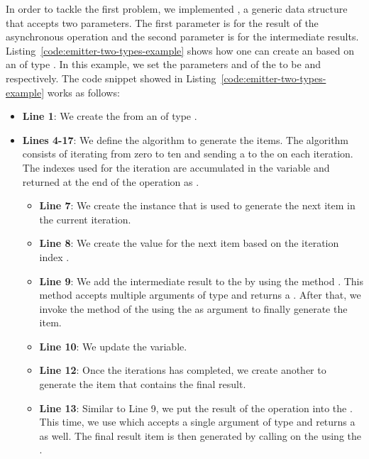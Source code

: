 \documentclass[type=bsc,accentcolor=tud9c]{tudthesis}
\begin{document}
In order to tackle the first problem, we implemented , a generic data structure that accepts two parameters. The first parameter  is for the result of the asynchronous operation and the second parameter  is for the intermediate results. Listing~\ref{code:emitter-two-types-example} shows how one can create an  based on an  of type . In this example, we set the parameters  and  of the  to be  and  respectively. The code snippet showed in Listing~\ref{code:emitter-two-types-example} works as follows:
\begin{itemize}
	\item {\bfseries Line 1}: We create the  from an  of type .
	\item {\bfseries Lines 4-17}: We define the algorithm to generate the items. The algorithm consists of iterating from zero to ten and sending a  to the  on each iteration. The indexes  used for the iteration are accumulated in the variable  and returned at the end of the operation as .
	\begin{itemize}
		\item {\bfseries Line 7}: We create the  instance that is used to generate the next item in the current iteration.
		\item {\bfseries Line 8}: We create the  value for the next item based on the iteration index .
		\item {\bfseries Line 9}: We add the intermediate result  to the  by using the method . This method accepts multiple arguments of type  and returns a . After that, we invoke the  method of the  using the  as argument to finally generate the item.
		\item {\bfseries Line 10}: We update the  variable.
		\item {\bfseries Line 12}: Once the iterations has completed, we create another  to generate the item that contains the final result.
		\item {\bfseries Line 13}: Similar to Line 9, we put the result of the operation into the . This time, we use  which accepts a single argument of type  and returns a  as well. The final result item is then generated by calling  on the  using the .

\end{itemize}
\end{itemize}
\end{document}
